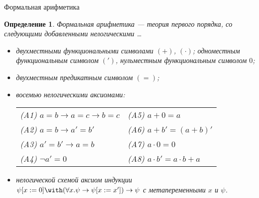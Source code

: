 \documentclass[aspectratio=169]{beamer}
\newtheorem{dfn}{Определение}[section]
\begin{document}
\begin{frame}{Формальная арифметика}
\begin{dfn}
Формальная арифметика --- теория первого порядка, со следующими добавленными нелогическими \dots
\begin{itemize}
\item двухместными функциональными символами $(+)$, $(\cdot)$; одноместным функциональным символом $(')$, 
нульместным функциональным символом $0$;\pause
\item двухместным предикатным символом $(=)$;\pause
\item восемью нелогическими \emph{аксиомами}:\vspace{0.1cm}
\begin{tabular}{ll}
(A1) $a=b \to a=c \to b=c$             &(A5) $a+0 = a$                     \\
(A2) $a=b \to a'=b'$                   &(A6) $a+b' = (a+b)'$               \\
(A3) $a'=b' \to a=b$                   &(A7) $a\cdot 0 = 0$                \\
(A4) $\neg a' = 0$                     &(A8) $a\cdot b' = a \cdot b + a$
\end{tabular}\pause
\item нелогической схемой аксиом индукции $\psi[x:=0]\with(\forall x.\psi\to \psi[x:=x'])\to \psi$ с метапеременными $x$ и $\psi$.
\end{itemize}
\end{dfn}
\end{frame}
\end{document}

